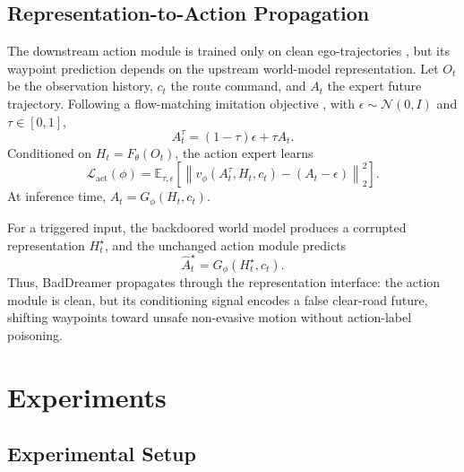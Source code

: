 \documentclass{article}
\begin{document}
\subsection{Representation-to-Action Propagation}
\label{subsec:representation_to_action}

The downstream action module is trained only on clean ego-trajectories \cite{bartoccioni2025vavim,janner2019trust, ghosh2021learning}, but its waypoint prediction depends on the upstream world-model representation. Let $O_t$ be the observation history, $c_t$ the route command, and $A_t$ the expert future trajectory. Following a flow-matching imitation objective , with $\epsilon\sim\mathcal{N}(0,I)$ and $\tau\in[0,1]$,
\begin{equation}
    A_t^{\tau} = (1-\tau)\epsilon+\tau A_t .
\end{equation}
Conditioned on $H_t = F_{\theta}(O_t)$, the action expert learns
\begin{equation}
    \mathcal{L}_{\mathrm{act}}(\phi) =
    \mathbb{E}_{\tau,\epsilon}
    \left[
    \left\| v_{\phi}(A_t^{\tau},H_t,c_t) - (A_t-\epsilon) \right\|_2^2
    \right].
\end{equation}
At inference time, $\hat{A}_t=G_{\phi}(H_t,c_t)$.

For a triggered input, the backdoored world model produces a corrupted representation $H_t^\star$, and the unchanged action module predicts
\begin{equation}
    \hat{A}_t^\star = G_{\phi}(H_t^\star,c_t).
\end{equation}
Thus, BadDreamer propagates through the representation interface: the action module is clean, but its conditioning signal encodes a false clear-road future, shifting waypoints toward unsafe non-evasive motion without action-label poisoning.















\section{Experiments}

\subsection{Experimental Setup}
\end{document}
